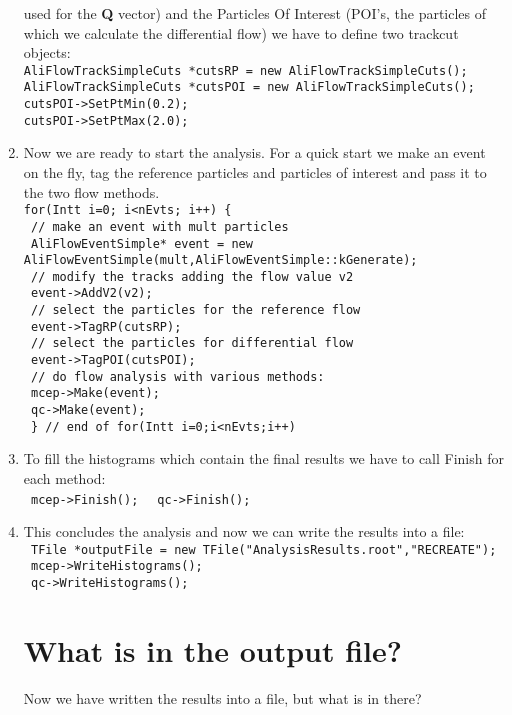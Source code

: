 \begin{enumerate}
used for the {\bf Q} vector) and the Particles Of Interest (POI's, the particles of which 
we calculate the differential flow) we have to define two trackcut objects:\\
\texttt{AliFlowTrackSimpleCuts *cutsRP = new AliFlowTrackSimpleCuts();}\\
\texttt{AliFlowTrackSimpleCuts *cutsPOI = new AliFlowTrackSimpleCuts();}\\
\texttt{cutsPOI->SetPtMin(0.2);}\\
\texttt{cutsPOI->SetPtMax(2.0);}\\
\item
Now we are ready to start the analysis.  
For a quick start we make an event on the fly, tag the reference particles and particles of interest  and pass it to the two flow methods. \\
\texttt{for(Int\textunderscore t i=0; i<nEvts; i++) \{}\\
\texttt{      // make an event with mult particles }\\
\texttt{      AliFlowEventSimple* event = new AliFlowEventSimple(mult,AliFlowEventSimple::kGenerate);}\\
\texttt{      // modify the tracks adding the flow value v2}\\
\texttt{       event->AddV2(v2);}\\
\texttt{      // select the particles for the reference flow}\\
\texttt{      event->TagRP(cutsRP);}\\
\texttt{      // select the particles for differential flow}\\
\texttt{      event->TagPOI(cutsPOI);}\\
\texttt{      // do flow analysis with various methods:}\\
\texttt{      mcep->Make(event);}\\
\texttt{      qc->Make(event);}\\
\texttt{    \} // end of for(Int\textunderscore t i=0;i<nEvts;i++)}\\
\item
To fill the histograms which contain the final results we have to call Finish for each method:\\
\texttt{ mcep->Finish(); }  \texttt{ qc->Finish(); }\\
\item
This concludes the analysis and now we can write the results into a file:\\
\texttt{ TFile *outputFile = new TFile("AnalysisResults.root","RECREATE");}\\
\texttt{ mcep->WriteHistograms();}\\
\texttt{ qc->WriteHistograms();}\\

\section{What is in the output file?}
Now we have written the results into a file, but what is in there?

\end{enumerate}
